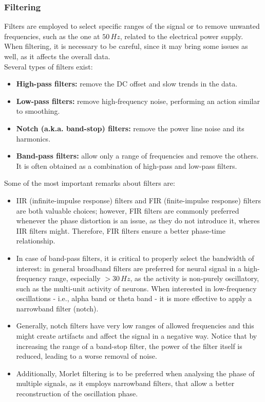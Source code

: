 \subsubsection{Filtering}
Filters are employed to select specific ranges of the signal or to remove unwanted frequencies,
such as the one at \(50\,Hz\), related to the electrical power supply. When filtering, it is
necessary to be careful, since it may bring some issues as well, as it affects the overall
data.\\
Several types of filters exist:
\begin{itemize}
    \item \textbf{High-pass filters:} remove the DC offset and slow trends in the data.
    \item \textbf{Low-pass filters:} remove high-frequency noise, performing an action
          similar to smoothing.
    \item \textbf{Notch (a.k.a. band-stop) filters:} remove the power line noise and its harmonics.
    \item \textbf{Band-pass filters:} allow only a range of frequencies and remove the others.
          It is often obtained as a combination of high-pass and low-pass filters.
\end{itemize}
Some of the most important remarks about filters are:
\begin{itemize}
    \item IIR (infinite-impulse response) filters and FIR (finite-impulse response)
          filters are both valuable choices; however, FIR filters are commonly preferred
          whenever the phase distortion is an issue, as they do not introduce it, wheres
          IIR filters might. Therefore, FIR filters ensure a better phase-time relationship.
    \item In case of band-pass filters, it is critical to properly select the
          bandwidth of interest: in general broadband filters are preferred for neural
          signal in a high-frequency range, especially \(>30\,Hz\), as the activity
          is non-purely oscillatory, such as the multi-unit activity of neurons. When
          interested in low-frequency oscillations - i.e., alpha band or theta band - it is
          more effective to apply a narrowband filter (notch).
    \item Generally, notch filters have very low ranges of allowed frequencies and
          this might create artifacts and affect the signal in a negative way. Notice
          that by increasing the range of a band-stop filter, the power of the filter itself
          is reduced, leading to a worse removal of noise.
    \item Additionally, Morlet filtering is to be preferred when analysing the phase
          of multiple signals, as it employs narrowband filters, that allow a better reconstruction
          of the oscillation phase.
\end{itemize}
